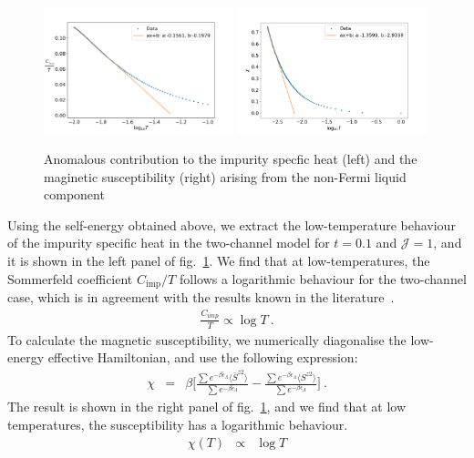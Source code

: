 \documentclass[reprint,onecolumn,prb,superscriptaddress]{revtex4-2}
\begin{document}
\begin{figure}[!htb]
\centering
\includegraphics[width=0.49\textwidth]{FINALfittedCvt0p1.png}
\includegraphics[width=0.49\textwidth]{NFLChilog0p1}
\caption{Anomalous contribution to the impurity specfic heat (left) and the maginetic susceptibility (right) arising from the non-Fermi liquid component}
\label{fig:Cv_imp}
\end{figure}
Using the self-energy obtained above, we extract the low-temperature behaviour of the impurity specific heat in the two-channel model for $t=0.1$ and $\mathcal{J}=1$, and it is shown in the left panel of fig.~\ref{fig:Cv_imp}. We find that at low-temperatures, the Sommerfeld coefficient \(C_\text{imp}/T\) follows a logarithmic behaviour for the two-channel case, which is in agreement with the results known in the literature~\cite{affleck_1991_overscreen,affleck_ludwig_1991,affleck_pang_cox_1992,affleck1993exact,
parcollet_olivier_large_N,affleck_2005,emery_kivelson,clarke_giamarchi_1993,zarand_2000,
vondelft_prl_1998,schofield_1997,bullaNRGreview,affleck_pang_cox_1992,pang_cox_1991,
andrei_destri_1984,Tsvelick1984,Tsvelick_1985,andrei_jerez_1995,zarand_costi_2002,
sengupta_1994,fabrizio_nozieres_1995,Coleman_tsvelik,fabrizio_gogolin_1995}.
\begin{eqnarray}
\frac{C_{imp}}{T} \propto \log T~.
\end{eqnarray}
To calculate the magnetic susceptibility, we numerically diagonalise the low-energy effective Hamiltonian, and use the following expression:
\begin{eqnarray}
\chi &=& \beta\bigg[\frac{\sum e^{-\beta \bar{\epsilon}_{\Lambda}} \langle \bar{S}^{z2} \rangle}{\sum e^{-\beta \bar{\epsilon}_{\Lambda}} } -\frac{\sum e^{-\beta \epsilon_{\Lambda}} \langle S^{z2 }\rangle }{\sum e^{-\beta \epsilon_{\Lambda}} } \bigg] ~.
\end{eqnarray}
The result is shown in the right panel of fig.~\ref{fig:Cv_imp}, and we find that at low temperatures, the susceptibility has a logarithmic behaviour.
\begin{eqnarray}
\chi(T) &\propto& \log T
\end{eqnarray}
\end{document}
